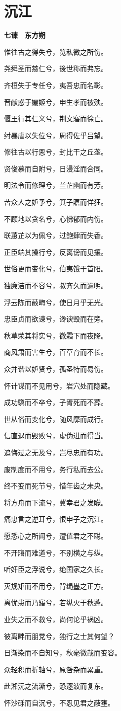 \documentclass[12pt,a4paper]{ctexbook}
\begin{document}
\section{沉江}
\textbf{七谏　东方朔}\par\vspace{0.5em}
惟往古之得失兮，览私微之所伤。\par
尧舜圣而慈仁兮，後世称而弗忘。\par
齐桓失于专任兮，夷吾忠而名彰。\par
晋献惑于孋姬兮，申生孝而被殃。\par
偃王行其仁义兮，荆文寤而徐亡。\par
纣暴虐以失位兮，周得佐乎吕望。\par
修往古以行恩兮，封比干之丘垄。\par
贤俊慕而自附兮，日浸淫而合同。\par
明法令而修理兮，兰芷幽而有芳。\par
苦众人之妒予兮，箕子寤而佯狂。\par
不顾地以贪名兮，心怫郁而内伤。\par
联蕙芷以为佩兮，过鲍肆而失香。\par
正臣端其操行兮，反离谤而见攘。\par
世俗更而变化兮，伯夷饿于首阳。\par
独廉洁而不容兮，叔齐久而逾明。\par
浮云陈而蔽晦兮，使日月乎无光。\par
忠臣贞而欲谏兮，谗谀毁而在旁。\par
秋草荣其将实兮，微霜下而夜降。\par
商风肃而害生兮，百草育而不长。\par
众并谐以妒贤兮，孤圣特而易伤。\par
怀计谋而不见用兮，岩穴处而隐藏。\par
成功隳而不卒兮，子胥死而不葬。\par
世从俗而变化兮，随风靡而成行。\par
信直退而毁败兮，虚伪进而得当。\par
追悔过之无及兮，岂尽忠而有功。\par
废制度而不用兮，务行私而去公。\par
终不变而死节兮，惜年齿之未央。\par
将方舟而下流兮，冀幸君之发矇。\par
痛忠言之逆耳兮，恨申子之沉江。\par
愿悉心之所闻兮，遭值君之不聪。\par
不开寤而难道兮，不别横之与纵。\par
听奸臣之浮说兮，绝国家之久长。\par
灭规矩而不用兮，背绳墨之正方。\par
离忧患而乃寤兮，若纵火于秋蓬。\par
业失之而不救兮，尚何论乎祸凶。\par
彼离畔而朋党兮，独行之士其何望？\par
日渐染而不自知兮，秋毫微哉而变容。\par
众轻积而折轴兮，原咎杂而累重。\par
赴湘沅之流澌兮，恐逐波而复东。\par
怀沙砾而自沉兮，不忍见君之蔽壅。\par
\end{document}
